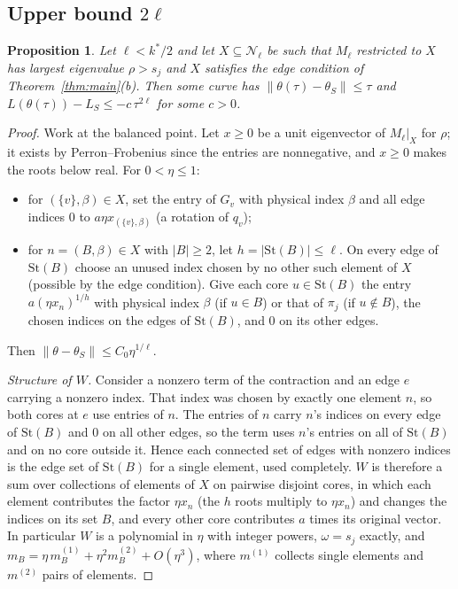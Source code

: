 \documentclass[11pt]{article}
\newtheorem{proposition}{Proposition}
\theoremstyle{definition}
\newcommand{\St}{\mathrm{St}}
\begin{document}
\subsection{Upper bound $2\ell$}

\begin{proposition}\label{prop:sharp}
Let $\ell<k^*/2$ and let $X\subseteq\mathcal N_\ell$ be such that $M_\ell$ restricted to $X$ has largest eigenvalue $\rho>s_j$ and
$X$ satisfies the edge condition of Theorem~\ref{thm:main}(b). Then some curve has $\lVert\theta(\tau)-\theta_S\rVert\le\tau$ and
$L(\theta(\tau))-L_S\le-c\,\tau^{2\ell}$ for some $c>0$.
\end{proposition}
\begin{proof}
Work at the balanced point. Let $x\ge0$ be a unit eigenvector of $M_\ell|_X$ for $\rho$; it exists by Perron--Frobenius since the
entries are nonnegative, and $x\ge0$ makes the roots below real. For $0<\eta\le1$:
\begin{itemize}
\item for $(\{v\},\beta)\in X$, set the entry of $G_v$ with physical index $\beta$ and all edge indices $0$ to $a\eta x_{(\{v\},\beta)}$
(a rotation of $q_v$);
\item for $n=(B,\beta)\in X$ with $\lvert B\rvert\ge2$, let $h=\lvert\St(B)\rvert\le\ell$. On every edge of $\St(B)$ choose an unused index
chosen by no other such element of $X$ (possible by the edge condition). Give each core $u\in\St(B)$ the entry
$a(\eta x_n)^{1/h}$ with physical index $\beta$ (if $u\in B$) or that of $\pi_j$ (if $u\notin B$), the chosen indices on the edges
of $\St(B)$, and $0$ on its other edges.
\end{itemize}
Then $\lVert\theta-\theta_S\rVert\le C_0\eta^{1/\ell}$.

\emph{Structure of $W$.} Consider a nonzero term of the contraction and an edge $e$ carrying a nonzero index. That index was
chosen by exactly one element $n$, so both cores at $e$ use entries of $n$. The entries of $n$ carry $n$'s indices on every
edge of $\St(B)$ and $0$ on all other edges, so the term uses $n$'s entries on all of $\St(B)$ and on no core outside it. Hence
each connected set of edges with nonzero indices is the edge set of $\St(B)$ for a single element, used completely. $W$ is
therefore a sum over collections of elements of $X$ on pairwise disjoint cores, in which each element contributes the factor
$\eta x_n$ (the $h$ roots multiply to $\eta x_n$) and changes the indices on its set $B$, and every other core contributes $a$
times its original vector. In particular $W$ is a polynomial in $\eta$ with integer powers, $\omega=s_j$ exactly, and
$m_B=\eta\,m_B^{(1)}+\eta^2m_B^{(2)}+O(\eta^3)$, where $m^{(1)}$ collects single elements and $m^{(2)}$ pairs of elements.


\end{proof}
\end{document}
